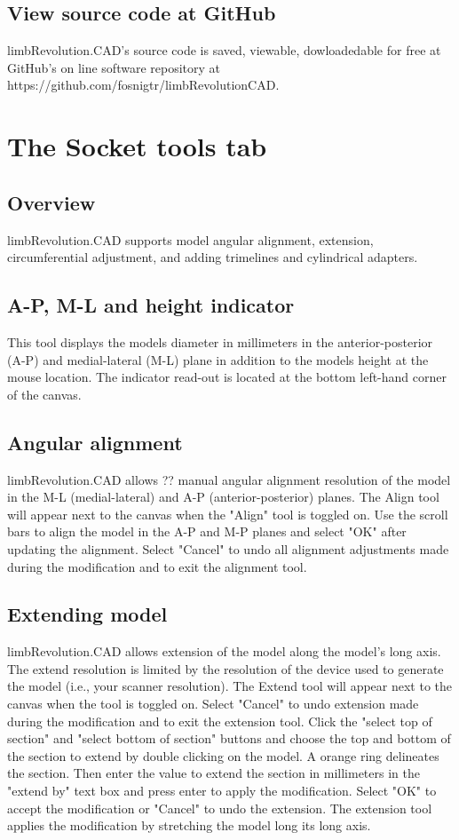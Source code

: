 \documentclass[twoside,a4paper]{refrep}
\begin{document}
	\subsection{View source code at GitHub}
	\label{GitHub}
	limbRevolution.CAD's source code is saved, viewable, dowloadedable for free at GitHub's on line software repository at https://github.com/fosnigtr\newline/limbRevolutionCAD.
	\section{The Socket tools tab}
	\subsection{Overview}
	limbRevolution.CAD supports model angular alignment, extension, circumferential adjustment, and adding trimelines and cylindrical adapters.
	\subsection{A-P, M-L and height indicator}
	\label{Indicator}
	This tool displays the models diameter in millimeters in the anterior-posterior (A-P) and medial-lateral (M-L) plane in addition to the models height at the mouse location. The indicator read-out is located at the bottom left-hand corner of the canvas. 
	\subsection{Angular alignment}
	\label{AngAlign}
	limbRevolution.CAD allows ?? manual angular alignment resolution of the model in the M-L (medial-lateral) and A-P (anterior-posterior) planes. The Align tool will appear next to the canvas when the "Align" tool is toggled on. Use the scroll bars to align the model in the A-P and M-P planes and select "OK" after updating the alignment. Select "Cancel" to undo all alignment adjustments made during the modification and to exit the alignment tool.
	\subsection{Extending model}
	\label{Extend}
	limbRevolution.CAD allows extension of the model along the model's long axis. The extend resolution is limited by the resolution of the device used to generate the model (i.e., your scanner resolution). The Extend tool will appear next to the canvas when the tool is toggled on. Select "Cancel" to undo extension made during the modification and to exit the extension tool. Click the "select top of section" and "select bottom of section" buttons and choose the top and bottom of the section to extend by double clicking on the model. A orange ring delineates the section. Then enter the value to extend the section in millimeters in the "extend by" text box and press enter to apply the modification. Select "OK" to accept the modification or "Cancel" to undo the extension. The extension tool applies the modification by stretching the model long its long axis.
\end{document}

